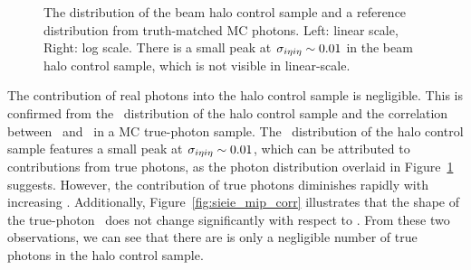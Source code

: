 \begin{figure}[htbp]
  \centering
  \caption{
    The \sieie distribution of the beam halo control sample and a reference distribution from truth-matched MC photons. 
    Left: linear scale, Right: log scale. 
    There is a small peak at $\sigma_{i\eta i\eta} \sim 0.01$ in the beam halo control sample, which is not visible in linear-scale.
  }
  \label{fig:halo_sieie}
\end{figure}

The contribution of real photons into the halo control sample is negligible.
This is confirmed from the \sieie\ distribution of the halo control sample and the correlation between \sieie\ and \emip\ in a MC true-photon sample.
The \sieie\ distribution of the halo control sample features a small peak at $\sigma_{i\eta i\eta} \sim 0.01$, which can be attributed to contributions from true photons, as the photon \sieie distribution overlaid in Figure~\ref{fig:halo_sieie} suggests. 
However, the contribution of true photons diminishes rapidly with increasing \sieie. 
Additionally, Figure~\ref{fig:sieie_mip_corr} illustrates that the shape of the true-photon \sieie\ does not change significantly with respect to \emip. 
From these two observations, we can see that there are is only a negligible number of true photons in the halo control sample.

